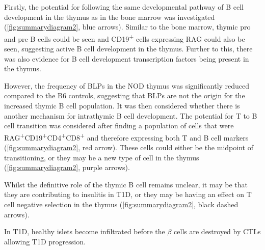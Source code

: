 Firstly, the potential for following the same developmental pathway of B cell development in the thymus as in the bone marrow was investigated (\cref{fig:summarydiagram2}, blue arrows).
Similar to the bone marrow, thymic pro and pre B cells could be seen and CD19\textsuperscript{+} cells expressing RAG could also be seen, suggesting active B cell development in the thymus.
Further to this, there was also evidence for B cell development transcription factors being present in the thymus.

However, the frequency of BLPs in the NOD thymus was significantly reduced compared to the B6 controls, suggesting that BLPs are not the origin for the increased thymic B cell population.
It was then considered whether there is another mechanism for intrathymic B cell development.
The potential for T to B cell transition was considered after finding a population of cells that were RAG\textsuperscript{+}CD19\textsuperscript{+}CD4\textsuperscript{+}CD8\textsuperscript{+} and therefore expressing both T and B cell markers (\cref{fig:summarydiagram2}, red arrow).
These cells could either be the midpoint of transitioning, or they may be a new type of cell in the thymus (\cref{fig:summarydiagram2}, purple arrows).

Whilst the definitive role of the thymic B cell remains unclear, it may be that they are contributing to insulitis in T1D, or they may be having an effect on T cell negative selection in the thymus (\cref{fig:summarydiagram2}, black dashed arrows).

In T1D, healthy islets become infiltrated before the $\beta$ cells are destroyed by CTLs allowing T1D progression.


